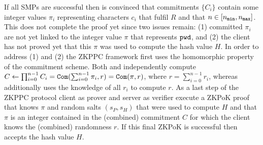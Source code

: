 If all \acp{SMP} are successful then \Server is convinced that commitments $\{C_i\}$ contain some integer values $\pi_i$ representing characters $c_i$ that fulfil $R$ and that $n\in[{n_\mathtt{min}},{n_\mathtt{max}}]$. 
This does not complete the proof yet since two issues remain: 
(1) committed $\pi_i$ are not yet linked to the integer value $\pi$ that represents $\mathtt{pwd}$, and 
(2) the client has not proved yet that this $\pi$ was used to compute the hash value $H$. 
In order to address (1) and (2) the \ac{ZKPPC} framework first uses the homomorphic property of the commitment scheme.
Both \Client and \Server independently compute $C\gets\prod_{i=0}^{n-1}C_i=\mathtt{Com}(\sum_{i=0}^{n-1} \pi_i,r)= \mathtt{Com}(\pi, r)$, where $r = \sum_{i=0}^{n-1} r_i$, whereas \Client additionally uses the knowledge of all $r_i$ to compute $r$. 
As a last step of the \ac{ZKPPC} protocol client \Client as prover and server \Server as verifier execute a \ac{ZKPoK} proof that \Client knows $\pi$ and random salts $(s_P, s_H)$ that were used to compute $H$ and that $\pi$ is an integer contained in the (combined) commitment $C$ for which the client knows the (combined) randomness $r$. 
If this final \ac{ZKPoK} is successful then \Server accepts the hash value $H$.



